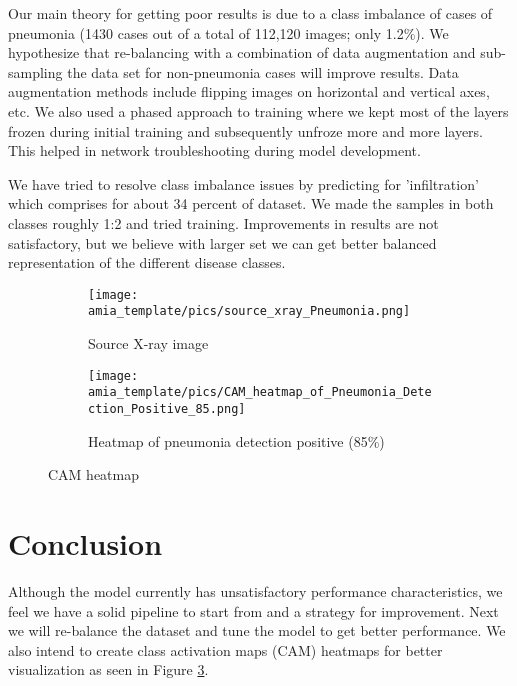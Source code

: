 \documentclass{amia}
\begin{document}
Our main theory for getting poor results is due to a class imbalance of cases of pneumonia (1430 cases out of a total of 112,120 images; only 1.2\%). We hypothesize that re-balancing with a combination of data augmentation and sub-sampling the data set for non-pneumonia cases will improve results. Data augmentation methods include  flipping images on horizontal and vertical axes, etc. We also used a phased approach to training where we kept most of the layers frozen during initial training and subsequently unfroze more and more layers. This helped in network troubleshooting during model development.

We have tried to resolve class imbalance issues by predicting for 'infiltration' which comprises for about 34 percent of dataset. We made the samples in both classes roughly 1:2 and tried training. Improvements in results are not satisfactory, but we believe with larger set we can get better balanced representation of the different disease classes.

\bigskip

\begin{figure}
\centering
\begin{subfigure}{.4\textwidth}
  \centering
  \texttt{[image: amia\_template/pics/source\_xray\_Pneumonia.png]}
  \caption{Source X-ray image}
  \label{fig:sub1}
\end{subfigure}
\begin{subfigure}{.4\textwidth}
  \centering
  \texttt{[image: amia\_template/pics/CAM\_heatmap\_of\_Pneumonia\_Detection\_Positive\_85.png]}
  \caption{Heatmap of pneumonia detection positive (85\%)}
  \label{fig:sub2}
\end{subfigure}
\caption{CAM heatmap \cite{ref5} }
\label{fig:cam_heatmap}
\end{figure}

\section*{Conclusion}
Although the model currently has unsatisfactory performance characteristics, we feel we have a solid pipeline to start from and a strategy for improvement. Next we will re-balance the dataset and tune the model to get better performance. We also intend to create class activation maps (CAM) heatmaps for better visualization as seen in Figure \ref{fig:cam_heatmap}.

\makeatletter

\let\oldsection\section
\renewcommand\section{\clearpage\oldsection}
\end{document}
